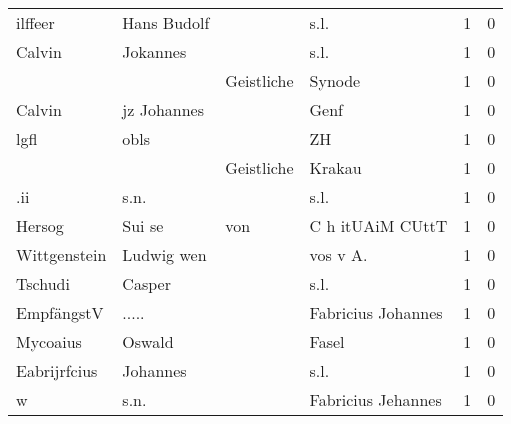 \begin{center}
\begin{tiny}
\begin{longtabu}{llllrr}
                  ilffeer &                        Hans Budolf &             &                                        s.l. &          1 &         0 \\
                   Calvin &                           Jokannes &             &                                        s.l. &          1 &         0 \\
                          &                                    &  Geistliche &                                      Synode &          1 &         0 \\
                   Calvin &                        jz Johannes &             &                                        Genf &          1 &         0 \\
                     lgfl &                               obls &             &                                          ZH &          1 &         0 \\
                          &                                    &  Geistliche &                                      Krakau &          1 &         0 \\
                      .ii &                               s.n. &             &                                        s.l. &          1 &         0 \\
                   Hersog &                             Sui se &         von &                            C h itUAiM CUttT &          1 &         0 \\
             Wittgenstein &                         Ludwig wen &             &                                   vos v A.  &          1 &         0 \\
                  Tschudi &                             Casper &             &                                        s.l. &          1 &         0 \\
               EmpfängstV &                              ..... &             &                          Fabricius Johannes &          1 &         0 \\
                 Mycoaius &                             Oswald &             &                                       Fasel &          1 &         0 \\
             Eabrijrfcius &                           Johannes &             &                                        s.l. &          1 &         0 \\
                        w &                               s.n. &             &                          Fabricius Jehannes &          1 &         0 \\

\end{longtabu}
\end{tiny}
\end{center}
